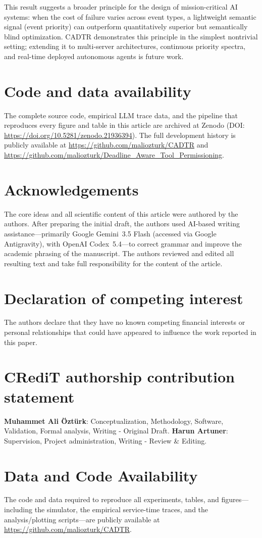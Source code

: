 \documentclass[fleqn,12pt,lineno]{wlpeerj}
\begin{document}
This result suggests a broader principle for the design of mission-critical AI systems: when the cost of failure varies across event types, a lightweight semantic signal (event priority) can outperform quantitatively superior but semantically blind optimization. CADTR demonstrates this principle in the simplest nontrivial setting; extending it to multi-server architectures, continuous priority spectra, and real-time deployed autonomous agents is future work.

\section*{Code and data availability}
The complete source code, empirical LLM trace data, and the pipeline
that reproduces every figure and table in this article are archived at
Zenodo (DOI: \url{https://doi.org/10.5281/zenodo.21936394}). The full
development history is publicly available at
\url{https://github.com/maliozturk/CADTR} and
\url{https://github.com/maliozturk/Deadline_Aware_Tool_Permissioning}.

\section*{Acknowledgements}
The core ideas and all scientific content of this article were authored
by the authors. After preparing the initial draft, the authors used
AI-based writing assistance---primarily Google Gemini~3.5 Flash
(accessed via Google Antigravity), with OpenAI Codex~5.4---to correct
grammar and improve the academic phrasing of the manuscript. The authors
reviewed and edited all resulting text and take full responsibility for
the content of the article.

\section*{Declaration of competing interest}
The authors declare that they have no known competing financial interests or personal relationships that could have appeared to influence the work reported in this paper.

\section*{CRediT authorship contribution statement}
\textbf{Muhammet Ali Öztürk}: Conceptualization, Methodology, Software, Validation, Formal analysis, Writing - Original Draft. \textbf{Harun Artuner}: Supervision, Project administration, Writing - Review \& Editing.

\section*{Data and Code Availability}
\label{sec:data}
The code and data required to reproduce all experiments, tables, and figures---including the simulator, the empirical service-time traces, and the analysis/plotting scripts---are publicly available at \url{https://github.com/maliozturk/CADTR}.

\clearpage

\end{document}
